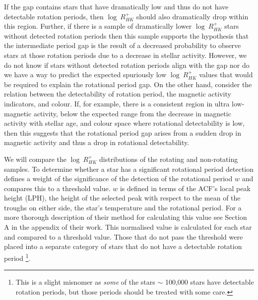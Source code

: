 If the gap contains stars that have dramatically low \rper{} and thus do not have detectable rotation periods, then $\log \ R^{+}_{HK}$ should also dramatically drop within this region.
Further, if there is a sample of dramatically lower $\log \ R^{+}_{HK}$ stars without detected rotation periods then this sample supports the hypothesis that the intermediate period gap is the result of a decreased probability to observe stars at those rotation periods due to a decrease in stellar activity.
However, we do not know if stars without detected rotation periods align with the gap nor do we have a way to predict the expected spuriously low $\log \ R^{+}_{HK}$ values that would be required to explain the rotational period gap.
On the other hand, consider the relation between the detectability of rotation period, the magnetic activity indicators, and colour.
If, for example, there is a consistent region in ultra low-magnetic activity, below the expected range from the decrease in magnetic activity with stellar age, and colour space where rotational detectability is low, then this suggests that the rotational period gap arises from a sudden drop in magnetic activity and thus a drop in rotational detectability.

We will compare the $\log \ R^{+}_{HK}$  distributions of the \citet{mcquillan_rotation_2014} rotating and non-rotating samples.
To determine whether a star has a significant rotational period detection \citet{mcquillan_rotation_2014} defines a weight of the significance of the detection of the rotational period $w$ and compares this to a threshold value.
$w$ is defined in terms of the ACF's local peak height (LPH), the height of the selected peak with respect to the mean of the troughs on either side, the star's temperature and the rotational period.
For a more thorough description of their method for calculating this value see Section A in the appendix of their work.
This normalised value is calculated for each star and compared to a threshold value.
Those that do not pass the threshold were placed into a separate category of stars that do not have a detectable rotation period \footnote{ This is a slight misnomer as \textit{some} of the stars $\sim$ 100,000 stars have detectable rotation periods, but those periods should be treated with some care.}.

